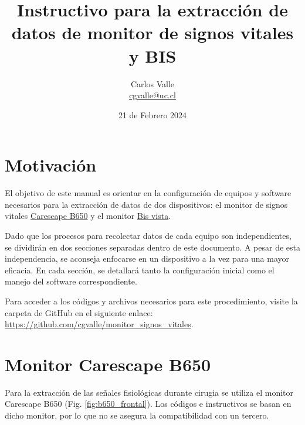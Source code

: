 \documentclass{article}
\begin{document}
\title{\huge \textbf{Instructivo para la extracción de datos de monitor de signos vitales y BIS } \vspace{8cm}}
\author{Carlos Valle \\ \href{mailto:cgvalle@uc.cl}{cgvalle@uc.cl} }
\date{21 de Febrero 2024}
\maketitle


\newpage

\section{Motivación}

El objetivo de este manual es orientar en la configuración de equipos y software necesarios para la extracción de datos de dos dispositivos: el monitor de signos vitales \href{https://www.gehealthcare.com/products/patient-monitoring/patient-monitors/carescape-monitor-b650}{Carescape B650} y el monitor \href{https://www.medtronic.com/covidien/es-cl/products/brain-monitoring/bis-complete-4-channel-monitor.html}{Bis vista}.

Dado que los procesos para recolectar datos de cada equipo son independientes, se dividirán en dos secciones separadas dentro de este documento. A pesar de esta independencia, se aconseja enfocarse en un dispositivo a la vez para una mayor eficacia. En cada sección, se detallará tanto la configuración inicial como el manejo del software correspondiente.

Para acceder a los códigos y archivos necesarios para este procedimiento, visite la carpeta de GitHub en el siguiente enlace: \url{https://github.com/cgvalle/monitor_signos_vitales}.




\newpage



\section{Monitor Carescape B650}
Para la extracción de las señales fisiológicas durante cirugia se utiliza el monitor Carescape B650 (Fig. \ref{fig:b650_frontal}). Los códigos e instructivos se basan en dicho monitor, por lo que no se asegura la compatibilidad con un tercero. 
\end{document}
